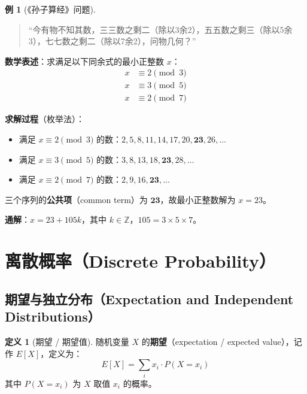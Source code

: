 \documentclass[UTF8,11pt,a4paper]{ctexbook}   %
\theoremstyle{definition}
\newtheorem{definition}{定义}[section]
\newtheorem{example}{例}[section]
\begin{document}
\begin{example}[《孙子算经》问题]
\begin{quote}
``今有物不知其数，三三数之剩二（除以3余2），五五数之剩三（除以5余3），七七数之剩二（除以7余2），问物几何？''
\end{quote}

\textbf{数学表述}：求满足以下同余式的最小正整数 $x$：
\begin{align*}
x &\equiv 2 \pmod{3} \\
x &\equiv 3 \pmod{5} \\
x &\equiv 2 \pmod{7}
\end{align*}

\textbf{求解过程}（枚举法）：
\begin{itemize}
    \item 满足 $x \equiv 2 \pmod{3}$ 的数：$2, 5, 8, 11, 14, 17, 20, \mathbf{23}, 26, \ldots$
    \item 满足 $x \equiv 3 \pmod{5}$ 的数：$3, 8, 13, 18, \mathbf{23}, 28, \ldots$
    \item 满足 $x \equiv 2 \pmod{7}$ 的数：$2, 9, 16, \mathbf{23}, \ldots$
\end{itemize}

三个序列的\textbf{公共项}（common term）为 $\mathbf{23}$，故最小正整数解为 $x = 23$。

\vspace{0.5em}
\textbf{通解}：$x = 23 + 105k$，其中 $k \in \mathbb{Z}$，$105 = 3 \times 5 \times 7$。
\end{example}

\section{离散概率（Discrete Probability）}

\subsection{期望与独立分布（Expectation and Independent Distributions）}

\begin{definition}[期望 / 期望值]
随机变量 $X$ 的\textbf{期望}（expectation / expected value），记作 $E[X]$，定义为：
\[
E[X] = \sum_{i} x_i \cdot P(X = x_i)
\]
其中 $P(X = x_i)$ 为 $X$ 取值 $x_i$ 的概率。
\end{definition}
\end{document}

